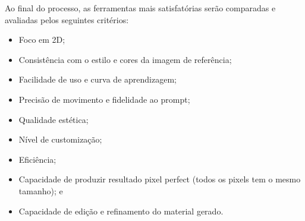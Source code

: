 Ao final do processo, as ferramentas mais satisfatórias serão comparadas e avaliadas pelos seguintes critérios:

\begin{itemize}
\item Foco em 2D;
\item Consistência com o estilo e cores da imagem de referência;
\item Facilidade de uso e curva de aprendizagem;
\item Precisão de movimento e fidelidade ao prompt;
\item Qualidade estética;
\item Nível de customização;
\item Eficiência;
\item Capacidade de produzir resultado pixel perfect (todos os pixels tem o mesmo tamanho); e
\item Capacidade de edição e refinamento do material gerado.
\end{itemize}
